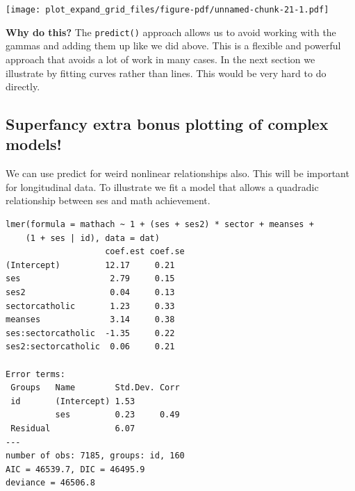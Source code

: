 \documentclass[
  letterpaper,
  DIV=11,
  numbers=noendperiod]{scrreprt}
\newenvironment{Shaded}{}{}
\newcommand{\AttributeTok}[1]{\textcolor[rgb]{0.49,0.56,0.16}{#1}}
\newcommand{\DecValTok}[1]{\textcolor[rgb]{0.25,0.63,0.44}{#1}}
\newcommand{\FunctionTok}[1]{\textcolor[rgb]{0.02,0.16,0.49}{#1}}
\newcommand{\NormalTok}[1]{#1}
\newcommand{\OtherTok}[1]{\textcolor[rgb]{0.00,0.44,0.13}{#1}}
\newcommand{\SpecialCharTok}[1]{\textcolor[rgb]{0.25,0.44,0.63}{#1}}
\begin{document}
\texttt{[image: plot\_expand\_grid\_files/figure-pdf/unnamed-chunk-21-1.pdf]}

\textbf{Why do this?} The \texttt{predict()} approach allows us to avoid
working with the gammas and adding them up like we did above. This is a
flexible and powerful approach that avoids a lot of work in many cases.
In the next section we illustrate by fitting curves rather than lines.
This would be very hard to do directly.

\subsection{Superfancy extra bonus plotting of complex
models!}\label{superfancy-extra-bonus-plotting-of-complex-models}

We can use predict for weird nonlinear relationships also. This will be
important for longitudinal data. To illustrate we fit a model that
allows a quadradic relationship between ses and math achievement.

\begin{Shaded}
\end{Shaded}

\begin{verbatim}
lmer(formula = mathach ~ 1 + (ses + ses2) * sector + meanses + 
    (1 + ses | id), data = dat)
                    coef.est coef.se
(Intercept)         12.17     0.21  
ses                  2.79     0.15  
ses2                 0.04     0.13  
sectorcatholic       1.23     0.33  
meanses              3.14     0.38  
ses:sectorcatholic  -1.35     0.22  
ses2:sectorcatholic  0.06     0.21  

Error terms:
 Groups   Name        Std.Dev. Corr 
 id       (Intercept) 1.53          
          ses         0.23     0.49 
 Residual             6.07          
---
number of obs: 7185, groups: id, 160
AIC = 46539.7, DIC = 46495.9
deviance = 46506.8 
\end{verbatim}
\end{document}

